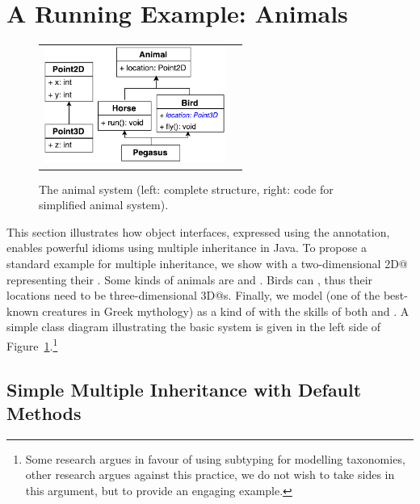 \section{A Running Example: Animals}\label{sec:ep}

\begin{figure}
\saveSpaceFig
\begin{tabular}{c|c}
\includegraphics[height=3.8cm]{PegasusDetail.pdf}\hspace{20pt} &
\begin{minipage}{7cm}
\vspace{-90pt}
\end{minipage}
\end{tabular}
\caption{The animal system (left: complete structure, right: code for simplified animal system).}\label{fig:pegasus}
\end{figure}

This section illustrates how object interfaces, expressed using the \mixinAnn{} annotation, enables powerful
idioms using multiple inheritance in Java.
To propose a standard example for multiple inheritance, we show \Q@Animal@s with a two-dimensional \Q@Point2D@ representing their \Q@location@.
Some kinds of animals are \Q@Horse@s and \Q@Bird@s.
Birds can \Q@fly@, thus their locations need to be three-dimensional \Q@Point3D@s.
Finally, we model \Q@Pegasus@ (one of the best-known creatures in Greek
mythology) as a kind of \Q@Animal@ with the skills
of both \Q@Horse@s and \Q@Bird@s. A simple class diagram illustrating
the basic system is given in the left side of Figure~\ref{fig:pegasus}.\footnote{Some research argues in favour of using subtyping for modelling taxonomies, other research argues against this practice, we do not wish to take sides in this argument, but to provide an engaging example.}

\subsection{Simple Multiple Inheritance with Default
  Methods}\label{sec:simple}

